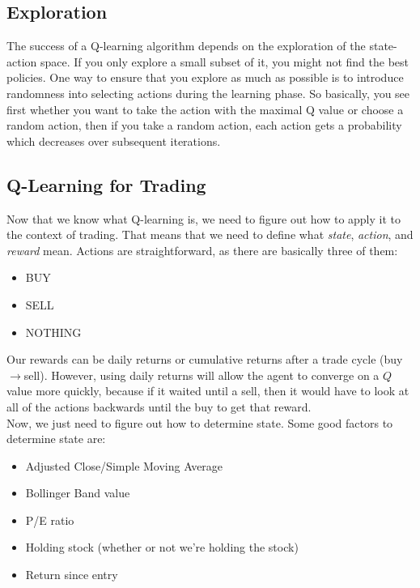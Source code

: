 \subsection{Exploration}
\noindent The success of a Q-learning algorithm depends on the exploration of the state-action space. If you only explore a small subset of it, you might not find the best policies. One way to ensure that you explore as much as possible is to introduce randomness into selecting actions during the learning phase. So basically, you see first whether you want to take the action with the maximal Q value or choose a random action, then if you take a random action, each action gets a probability which decreases over subsequent iterations.

\subsection{Q-Learning for Trading}
\noindent Now that we know what Q-learning is, we need to figure out how to apply it to the context of trading. That means that we need to define what \textit{state}, \textit{action}, and \textit{reward} mean. Actions are straightforward, as there are basically three of them:

\begin{itemize}
\item {\color{DarkerGreen} BUY}
\item {\color{red} SELL}
\item NOTHING
\end{itemize}

\noindent Our rewards can be daily returns or cumulative returns after a trade cycle (buy$\rightarrow$sell). However, using daily returns will allow the agent to converge on a $Q$ value more quickly, because if it waited until a sell, then it would have to look at all of the actions backwards until the buy to get that reward.\\

\noindent Now, we just need to figure out how to determine state. Some good factors to determine state are:

\begin{itemize}
\item Adjusted Close/Simple Moving Average
\item Bollinger Band value
\item P/E ratio
\item Holding stock (whether or not we're holding the stock)
\item Return since entry
\end{itemize}

